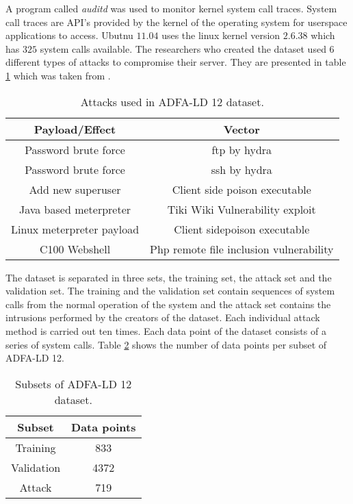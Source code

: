 \documentclass[reqno,openany,12pt]{amsbook}
\begin{document}

A program called \emph{auditd} was used to monitor kernel system call traces. System call traces are API's provided by the kernel of the operating system for userspace applications to access. Ubutnu $11.04$ uses the linux kernel version $2.6.38$ which has $325$ system calls available\cite{adf1}. The researchers who created the dataset used 6 different types of attacks to compromise their server. They are presented in table \ref{tab2} which was taken from \cite{dat2}.
\begin{table}
\begin{tabular}{|c|c|}
\hline
Payload/Effect & Vector \\ \hline 
Password brute force  & ftp by hydra \\ \hline
Password brute force & ssh by hydra \\ \hline
Add new superuser & Client side poison executable\\ \hline
Java based meterpreter & Tiki Wiki Vulnerability exploit\\ \hline
Linux meterpreter payload & Client sidepoison executable\\ \hline
C100 Webshell & Php remote file inclusion vulnerability \\ \hline
\end{tabular}
\vspace{5pt}
\caption{Attacks used in ADFA-LD 12 dataset.}
\label{tab2}
\end{table}
The dataset is separated in three sets, the training set, the attack set and the validation set. The training and the validation set contain sequences of system calls from the normal operation of the system and the attack set contains the intrusions performed by the creators of the dataset. Each individual attack method is carried out ten times. Each data point of the dataset consists of a series of system calls. Table \ref{tab3} shows the number of data points per subset of ADFA-LD 12.
\begin{table}
\begin{tabular}{|c|c|}
\hline
Subset &  Data points \\ \hline 
Training  & 833 \\ \hline
Validation & 4372 \\ \hline
Attack &  719\\ \hline
\end{tabular}
\vspace{5pt}
\caption{Subsets of ADFA-LD 12 dataset.}
\label{tab3}
\end{table}
\end{document}
